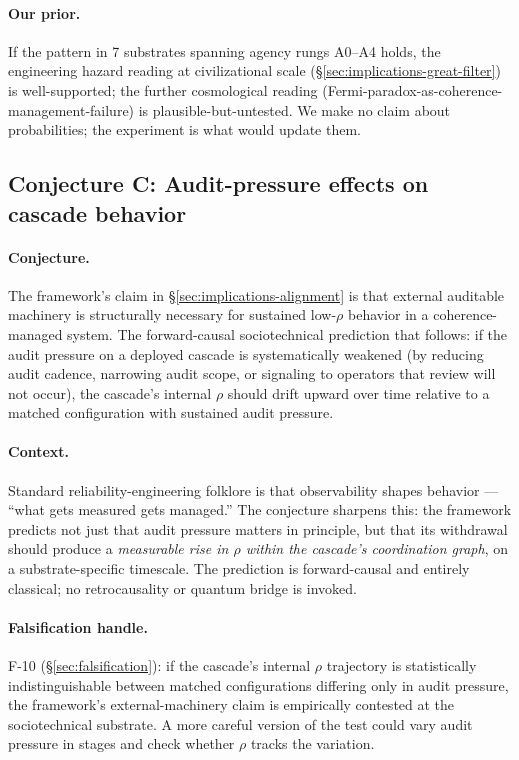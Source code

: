 \documentclass[11pt,a4paper]{article}
\begin{document}
\paragraph{Our prior.} If the pattern in 7 substrates spanning agency rungs A0--A4 holds, the engineering hazard reading at civilizational scale (\S\ref{sec:implications-great-filter}) is well-supported; the further cosmological reading (Fermi-paradox-as-coherence-management-failure) is plausible-but-untested. We make no claim about probabilities; the experiment is what would update them.

\subsection{Conjecture C: Audit-pressure effects on cascade behavior}
\label{sec:conjecture-audit}

\paragraph{Conjecture.} The framework's claim in \S\ref{sec:implications-alignment} is that external auditable machinery is structurally necessary for sustained low-$\rho$ behavior in a coherence-managed system. The forward-causal sociotechnical prediction that follows: if the audit pressure on a deployed cascade is systematically weakened (by reducing audit cadence, narrowing audit scope, or signaling to operators that review will not occur), the cascade's internal $\rho$ should drift upward over time relative to a matched configuration with sustained audit pressure.

\paragraph{Context.} Standard reliability-engineering folklore is that observability shapes behavior --- ``what gets measured gets managed.'' The conjecture sharpens this: the framework predicts not just that audit pressure matters in principle, but that its withdrawal should produce a \emph{measurable rise in $\rho$ within the cascade's coordination graph}, on a substrate-specific timescale. The prediction is forward-causal and entirely classical; no retrocausality or quantum bridge is invoked.

\paragraph{Falsification handle.} F-10 (\S\ref{sec:falsification}): if the cascade's internal $\rho$ trajectory is statistically indistinguishable between matched configurations differing only in audit pressure, the framework's external-machinery claim is empirically contested at the sociotechnical substrate. A more careful version of the test could vary audit pressure in stages and check whether $\rho$ tracks the variation.
\end{document}
